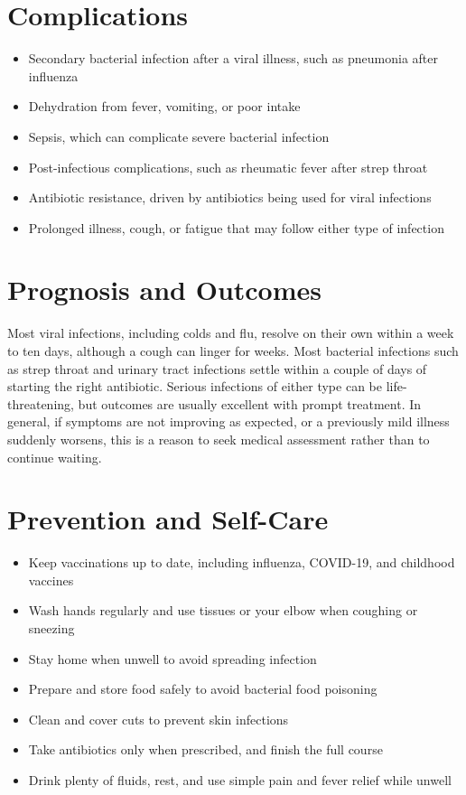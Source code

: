 \section*{Complications}
\begin{itemize}
    \item Secondary bacterial infection after a viral illness, such as pneumonia after influenza
    \item Dehydration from fever, vomiting, or poor intake
    \item Sepsis, which can complicate severe bacterial infection
    \item Post-infectious complications, such as rheumatic fever after strep throat
    \item Antibiotic resistance, driven by antibiotics being used for viral infections
    \item Prolonged illness, cough, or fatigue that may follow either type of infection
\end{itemize}

\section*{Prognosis and Outcomes}
Most viral infections, including colds and flu, resolve on their own within a week to ten days, although a cough can linger for weeks. Most bacterial infections such as strep throat and urinary tract infections settle within a couple of days of starting the right antibiotic. Serious infections of either type can be life-threatening, but outcomes are usually excellent with prompt treatment. In general, if symptoms are not improving as expected, or a previously mild illness suddenly worsens, this is a reason to seek medical assessment rather than to continue waiting.

\section*{Prevention and Self-Care}
\begin{itemize}
    \item Keep vaccinations up to date, including influenza, COVID-19, and childhood vaccines
    \item Wash hands regularly and use tissues or your elbow when coughing or sneezing
    \item Stay home when unwell to avoid spreading infection
    \item Prepare and store food safely to avoid bacterial food poisoning
    \item Clean and cover cuts to prevent skin infections
    \item Take antibiotics only when prescribed, and finish the full course
    \item Drink plenty of fluids, rest, and use simple pain and fever relief while unwell
\end{itemize}

